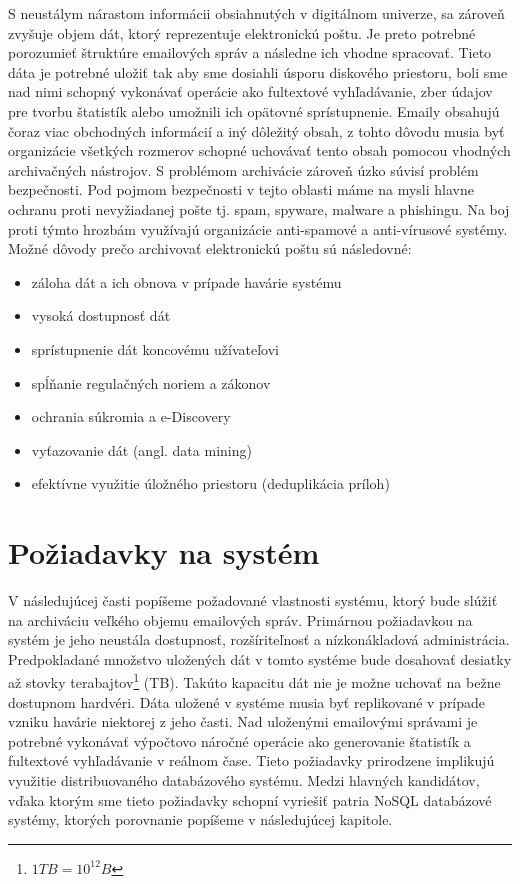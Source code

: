 \documentclass[11pt,twoside,a4paper]{book}
\begin{document}
S neustálym nárastom informácii obsiahnutých v digitálnom univerze, sa zároveň zvyšuje objem dát, ktorý reprezentuje elektronickú poštu. Je preto potrebné porozumieť štruktúre emailových správ a následne ich vhodne spracovať. Tieto dáta je potrebné uložiť tak aby sme dosiahli úsporu diskového priestoru, boli sme nad nimi schopný vykonávať operácie ako fultextové vyhľadávanie, zber údajov pre tvorbu štatistík alebo umožnili ich opätovné sprístupnenie. Emaily obsahujú čoraz viac obchodných informácií a iný dôležitý obsah, z tohto dôvodu musia byť organizácie všetkých rozmerov schopné uchovávať tento obsah pomocou vhodných archivačných nástrojov. S problémom archivácie zároveň úzko súvisí problém bezpečnosti. Pod pojmom bezpečnosti v tejto oblasti máme na mysli hlavne ochranu proti nevyžiadanej pošte tj. spam, spyware, malware a phishingu. Na boj proti týmto hrozbám využívajú organizácie anti-spamové a anti-vírusové systémy. Možné dôvody prečo archivovať elektronickú poštu sú následovné\cite{WhyArchiving}:
\begin{itemize}
 \item 
  záloha dát a ich obnova v prípade havárie systému
 \item
  vysoká dostupnosť dát
 \item
  sprístupnenie dát koncovému užívateľovi
 \item
  spĺňanie regulačných noriem a zákonov
 \item
  ochrania súkromia a e-Discovery
 \item
  vyťazovanie dát (angl. data mining)
 \item
  efektívne využitie úložného priestoru (deduplikácia príloh)
\end{itemize}


\section{Požiadavky na systém}

V následujúcej časti popíšeme požadované vlastnosti systému, ktorý bude slúžiť na archiváciu veľkého objemu emailových správ. Primárnou požiadavkou na systém je jeho neustála dostupnosť, rozšíriteľnosť a nízkonákladová administrácia. Predpokladané množstvo uložených dát v tomto systéme bude dosahovať desiatky až stovky terabajtov\footnote{$1 TB = 10^{12} B$} (TB). Takúto kapacitu dát nie je možne uchovať na bežne dostupnom hardvéri. Dáta uložené v systéme musia byť replikované v prípade vzniku havárie niektorej z jeho časti. Nad uloženými emailovými správami je potrebné vykonávať výpočtovo náročné operácie ako generovanie štatistík a fultextové vyhľadávanie v reálnom čase. Tieto požiadavky prirodzene implikujú využitie distribuovaného databázového systému. Medzi hlavných kandidátov, vďaka ktorým sme tieto požiadavky schopní vyriešiť patria NoSQL databázové systémy, ktorých porovnanie popíšeme v následujúcej kapitole.
\end{document}
